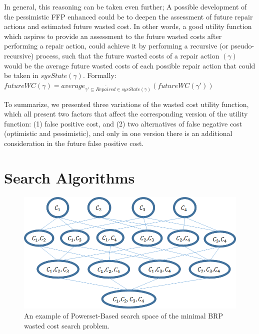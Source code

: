 \documentclass[a4paper,11pt]{report}
\newcommand\hilla[1]{\textcolor{blue}{hilla: #1}}
\newcommand\roni[1]{\textcolor{green}{roni: #1}}
\begin{document}
In general, this reasoning can be taken even further; A possible development of the pessimistic FFP enhanced could be to deepen the assessment of future repair actions and estimated future wasted cost. In other words, a good utility function which aspires to provide an assessment to the future wasted costs after performing a repair action, could achieve it by performing a recursive (or pseudo-recursive) process, such that the future wasted costs of a repair action $(\gamma)$ would be the average future wasted costs of each possible repair action that could be taken in $sysState(\gamma)$. Formally:
$futureWC(\gamma) = average_{\gamma{}'\subseteq \overline{Repaired} \in sysState(\gamma)}(futureWC(\gamma{}'))$

To summarize, we presented three variations of the wasted cost utility function, which all present two factors that affect the corresponding
version of the utility function: (1) false positive cost, and (2) two alternatives of false negative cost (optimistic and pessimistic), and only in one version there is an additional consideration in the future false positive cost.


\section{Search Algorithms}

\begin{figure}%
\centering
\includegraphics[width=0.75\columnwidth]{PowersetBasedSearch.png}%
\caption{An example of Powerset-Based search space of the minimal BRP wasted cost search problem.}%
\label{fig:power-search-space}%
\end{figure}
\end{document}
